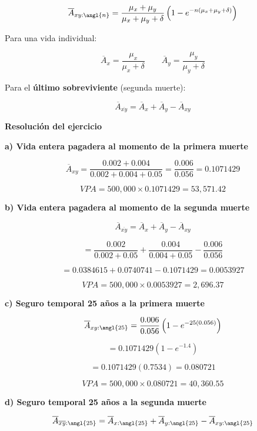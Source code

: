 \documentclass[12pt, a4paper, footinclude=true]{scrbook}
\begin{document}
	\[
	\overline{A}_{xy:\angl{n}}
	=
	\frac{\mu_x + \mu_y}{\mu_x + \mu_y + \delta}
	\left(
	1 - e^{-n(\mu_x+\mu_y+\delta)}
	\right)
	\]
	
	Para una vida individual:
	
	\[
	\overline{A}_x
	=
	\frac{\mu_x}{\mu_x+\delta}
	\qquad
	\overline{A}_y
	=
	\frac{\mu_y}{\mu_y+\delta}
	\]
	
	Para el \textbf{último sobreviviente} (segunda muerte):
	
	\[
	\overline{A}_{\overline{xy}}
	=
	\overline{A}_x
	+
	\overline{A}_y
	-
	\overline{A}_{xy}
	\]
	
	\vspace{0.5cm}
	
	\textbf{Resolución del ejercicio}
	
	\vspace{0.2cm}
	
	\textbf{a) Vida entera pagadera al momento de la primera muerte}
	
	\[
	\overline{A}_{xy}
	=
	\frac{0.002+0.004}{0.002+0.004+0.05}
	=
	\frac{0.006}{0.056}
	=
	0.1071429
	\]
	
	\[
	VPA
	=
	500{,}000
	\times
	0.1071429
	=
	53{,}571.42
	\]
	
	\textbf{b) Vida entera pagadera al momento de la segunda muerte}
	
	\[
	\overline{A}_{\overline{xy}}
	=
	\overline{A}_x
	+
	\overline{A}_y
	-
	\overline{A}_{xy}
	\]
	
	\[
	=
	\frac{0.002}{0.002+0.05}
	+
	\frac{0.004}{0.004+0.05}
	-
	\frac{0.006}{0.056}
	\]
	
	\[
	=
	0.0384615
	+
	0.0740741
	-
	0.1071429
	=
	0.0053927
	\]
	
	\[
	VPA
	=
	500{,}000
	\times
	0.0053927
	=
	2{,}696.37
	\]
	
	\textbf{c) Seguro temporal 25 años a la primera muerte}
	
	\[
	\overline{A}_{xy:\angl{25}}
	=
	\frac{0.006}{0.056}
	\left(
	1 - e^{-25(0.056)}
	\right)
	\]
	
	\[
	=
	0.1071429
	\left(
	1 - e^{-1.4}
	\right)
	\]
	
	\[
	=
	0.1071429
	(0.7534)
	=
	0.080721
	\]
	
	\[
	VPA
	=
	500{,}000
	\times
	0.080721
	=
	40{,}360.55
	\]
	
	\textbf{d) Seguro temporal 25 años a la segunda muerte}
	
	\[
	\overline{A}_{\overline{xy}:\angl{25}}
	=
	\overline{A}_{x:\angl{25}}
	+
	\overline{A}_{y:\angl{25}}
	-
	\overline{A}_{xy:\angl{25}}
	\]
	
\end{document}
